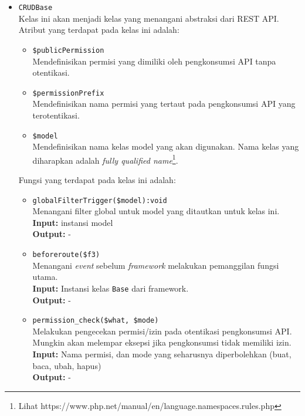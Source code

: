 \begin{itemize}
        \item  \texttt{CRUDBase} \\
            Kelas ini akan menjadi kelas yang menangani abstraksi dari REST API.
            Atribut yang terdapat pada kelas ini adalah:
            \begin{itemize}
                \item \texttt{\$publicPermission}\\
                    Mendefinisikan permisi yang dimiliki oleh pengkonsumsi API
                    tanpa otentikasi.
                \item \texttt{\$permissionPrefix}\\
                    Mendefinisikan nama permisi yang tertaut pada pengkonsumsi
                    API yang terotentikasi.
                \item \texttt{\$model}\\
                    Mendefinisikan nama kelas model yang akan digunakan. Nama
                    kelas yang diharapkan adalah \textit{fully qualified
                    name}\footnote{Lihat
                    https://www.php.net/manual/en/language.namespaces.rules.php}.
            \end{itemize}
            Fungsi yang terdapat pada kelas ini adalah:
            \begin{itemize}
                \item \texttt{globalFilterTrigger(\$model):void} \\
                    Menangani filter global untuk model yang ditautkan untuk
                    kelas ini. \\
                    \textbf{Input:} instansi model\\
                    \textbf{Output:} -
                
                \item \texttt{beforeroute(\$f3)}\\
                    Menangani \textit{event} sebelum \textit{framework}
                    melakukan pemanggilan fungsi utama.\\
                    \textbf{Input:} Instansi kelas \texttt{Base} dari
                    framework.\\
                    \textbf{Output:} -
                    
                \item \texttt{permission\_check(\$what, \$mode)} \\
                    Melakukan pengecekan permisi/izin pada otentikasi
                    pengkonsumsi API. Mungkin akan melempar eksepsi jika
                    pengkonsumsi tidak memiliki izin.\\
                    \textbf{Input:} Nama permisi, dan mode yang seharusnya
                        diperbolehkan (buat, baca, ubah, hapus)\\
                    \textbf{Output:} -
                

\end{itemize}
\end{itemize}
